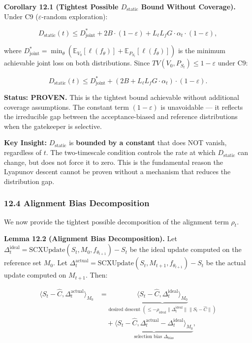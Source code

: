 \documentclass[
  12pt,
]{article}
\begin{document}
\textbf{Corollary 12.1 (Tightest Possible \(D_{\text{static}}\) Bound
Without Coverage).} Under C9 (\(\varepsilon\)-random exploration):

\[D_{\text{static}}(t) \leq D_{\text{joint}}^* + 2B \cdot (1 - \varepsilon) + L_\ell L_f G \cdot \alpha_t \cdot (1 - \varepsilon),\]

where
\(D_{\text{joint}}^* = \min_\theta (\mathbb{E}_{V_0}[\ell(f_\theta)] + \mathbb{E}_{P_{S_t}}[\ell(f_\theta)])\)
is the minimum achievable joint loss on both distributions. Since
\(TV(V_0, P_{S_t}) \leq 1 - \varepsilon\) under C9:

\[D_{\text{static}}(t) \leq D_{\text{joint}}^* + (2B + L_\ell L_f G \cdot \alpha_t) \cdot (1 - \varepsilon).\]

\textbf{Status: PROVEN.} This is the tightest bound achievable without
additional coverage assumptions. The constant term \((1-\varepsilon)\)
is unavoidable --- it reflects the irreducible gap between the
acceptance-biased and reference distributions when the gatekeeper is
selective.

\textbf{Key Insight:} \(D_{\text{static}}\) is \textbf{bounded by a
constant} that does NOT vanish, regardless of \(t\). The two-timescale
condition controls the rate at which \(D_{\text{static}}\) can change,
but does not force it to zero. This is the fundamental reason the
Lyapunov descent cannot be proven without a mechanism that reduces the
distribution gap.

\subsubsection{12.4 Alignment Bias
Decomposition}\label{alignment-bias-decomposition}

We now provide the tightest possible decomposition of the alignment term
\(\rho_t\).

\textbf{Lemma 12.2 (Alignment Bias Decomposition).} Let
\(\Delta_t^{\text{ideal}} = \text{SCXUpdate}(S_t, M_0, f_{\theta_{t+1}}) - S_t\)
be the ideal update computed on the reference set \(M_0\). Let
\(\Delta_t^{\text{actual}} = \text{SCXUpdate}(S_t, M_{t+1}, f_{\theta_{t+1}}) - S_t\)
be the actual update computed on \(M_{t+1}\). Then:

\[\begin{aligned}
\langle S_t - \hat{C}, \Delta_t^{\text{actual}} \rangle_{M_0} &= \underbrace{\langle S_t - \hat{C}, \Delta_t^{\text{ideal}} \rangle_{M_0}}_{\text{desired descent } (\leq -\rho_{\text{ideal}} \|\Delta_t^{\text{ideal}}\| \|S_t - \hat{C}\|)} \\
&\quad + \underbrace{\langle S_t - \hat{C}, \Delta_t^{\text{actual}} - \Delta_t^{\text{ideal}} \rangle_{M_0}}_{\text{selection bias } \Delta_{\text{bias}}},
\end{aligned}\]
\end{document}

